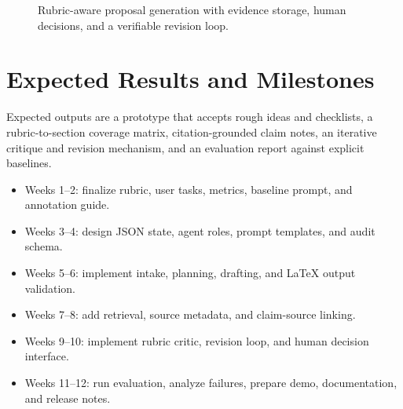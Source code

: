 \documentclass[11pt]{article}
\begin{document}
\begin{figure}[t]
\centering
\footnotesize
{}
\caption{Rubric-aware proposal generation with evidence storage, human decisions, and a verifiable revision loop.}
\label{fig:workflow}
\end{figure}

\section*{Expected Results and Milestones}
Expected outputs are a prototype that accepts rough ideas and checklists, a rubric-to-section coverage matrix, citation-grounded claim notes, an iterative critique and revision mechanism, and an evaluation report against explicit baselines.
\begin{itemize}
\item Weeks 1--2: finalize rubric, user tasks, metrics, baseline prompt, and annotation guide.
\item Weeks 3--4: design JSON state, agent roles, prompt templates, and audit schema.
\item Weeks 5--6: implement intake, planning, drafting, and LaTeX output validation.
\item Weeks 7--8: add retrieval, source metadata, and claim-source linking.
\item Weeks 9--10: implement rubric critic, revision loop, and human decision interface.
\item Weeks 11--12: run evaluation, analyze failures, prepare demo, documentation, and release notes.
\end{itemize}
\end{document}
